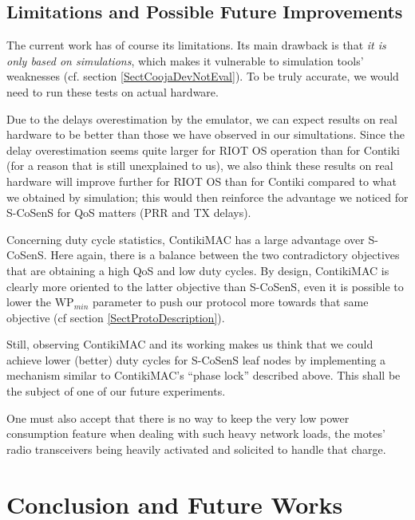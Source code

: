 \documentclass[conference]{IEEEtran}
\begin{document}
\subsection{Limitations and Possible Future Improvements}
\label{SectLimits}

The current work has of course its limitations. Its main drawback is that
\emph{it is only based on simulations}, which makes it vulnerable to
simulation tools' weaknesses (cf. section \ref{SectCoojaDevNotEval}).
To be truly accurate, we would need to run these tests
on actual hardware.

Due to the delays overestimation by the emulator, we can expect results on
real hardware to be better than those we have observed in our simultations.
Since the delay overestimation seems quite larger for RIOT OS operation
than for Contiki (for a reason that is still unexplained to us),
we also think these results on real hardware will improve further
for RIOT OS than for Contiki compared to what we obtained by simulation;
this would then reinforce the advantage we noticed for S-CoSenS for
QoS matters (PRR and TX delays).

Concerning duty cycle statistics, ContikiMAC has a large advantage over
S-CoSenS. Here again, there is a balance between the two contradictory
objectives that are obtaining a high QoS and low duty cycles. By design,
ContikiMAC is clearly more oriented to the latter objective than S-CoSenS,
even it is possible to lower the $\mathrm{WP}_{min}$ parameter to push
our protocol more towards that same objective (cf section
\ref{SectProtoDescription}).

Still, observing ContikiMAC and its working makes us think that we could
achieve lower (better) duty cycles for S-CoSenS leaf nodes by implementing
a mechanism similar to ContikiMAC's ``phase lock'' described above. This
shall be the subject of one of our future experiments.

One must also accept that there is no way to keep the very low power
consumption feature when dealing with such heavy network loads, the
motes' radio transceivers being heavily activated and solicited to
handle that charge.



\section{Conclusion and Future Works}
\end{document}
